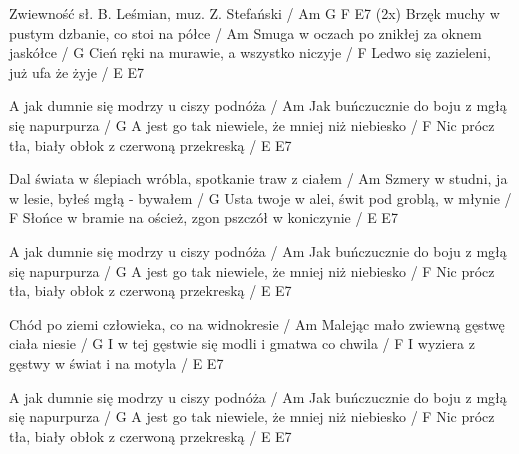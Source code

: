 Zwiewność
sł. B. Leśmian, muz. Z. Stefański
/ Am G F E7 (2x)
Brzęk muchy w pustym dzbanie, co stoi na półce / Am
Smuga w oczach po znikłej za oknem jaskółce / G
Cień ręki na murawie, a wszystko niczyje / F
Ledwo się zazieleni, już ufa że żyje / E E7

A jak dumnie się modrzy u ciszy podnóża / Am
Jak buńczucznie do boju z mgłą się napurpurza / G
A jest go tak niewiele, że mniej niż niebiesko / F
Nic prócz tła, biały obłok z czerwoną przekreską / E E7

Dal świata w ślepiach wróbla, spotkanie traw z ciałem / Am
Szmery w studni, ja w lesie, byłeś mgłą - bywałem / G
Usta twoje w alei, świt pod groblą, w młynie / F
Słońce w bramie na oścież, zgon pszczół w koniczynie / E E7

A jak dumnie się modrzy u ciszy podnóża / Am
Jak buńczucznie do boju z mgłą się napurpurza / G
A jest go tak niewiele, że mniej niż niebiesko / F
Nic prócz tła, biały obłok z czerwoną przekreską / E E7

Chód po ziemi człowieka, co na widnokresie / Am
Malejąc mało zwiewną gęstwę ciała niesie / G
I w tej gęstwie się modli i gmatwa co chwila / F
I wyziera z gęstwy w świat i na motyla / E E7

A jak dumnie się modrzy u ciszy podnóża / Am
Jak buńczucznie do boju z mgłą się napurpurza / G
A jest go tak niewiele, że mniej niż niebiesko / F
Nic prócz tła, biały obłok z czerwoną przekreską / E E7